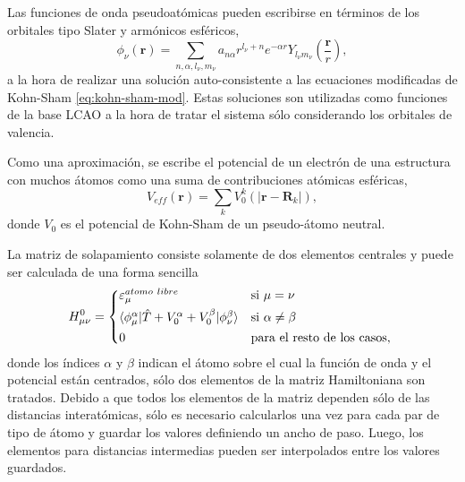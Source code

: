 \begin{enumerate}
        Las funciones de onda pseudoatómicas pueden escribirse en términos de los
        orbitales tipo Slater y armónicos esféricos,
        \begin{equation*}
        \phi_{\nu}(\mathbf{r}) = \sum_{n,\alpha,l_{\nu},m_{\nu}} a_{n\alpha} r^{l_{\nu}+n} e^{-\alpha r} Y_{l_{\nu}m_{\nu}}\left(\frac{\mathbf{r}}{r}\right),
        \end{equation*}
        a la hora de realizar una solución auto-consistente a las ecuaciones
        modificadas de Kohn-Sham \ref{eq:kohn-sham-mod}. Estas soluciones son
        utilizadas como funciones de la base LCAO a la hora de tratar el sistema
        sólo considerando los orbitales de valencia.
        
        Como una aproximación, se escribe el potencial de un electrón de una 
        estructura con muchos átomos como una suma de contribuciones atómicas
        esféricas,
        \begin{equation*}
        V_{eff}(\mathbf{r}) = \sum_k V_0^k(|\mathbf{r} - \mathbf{R}_k|),
        \end{equation*}
        donde $V_0$ es el potencial de Kohn-Sham de un pseudo-átomo neutral.

        La matriz de solapamiento consiste solamente de dos elementos centrales
        y puede ser calculada de una forma sencilla
        \begin{equation*}
            H_{\mu\nu}^0 = 
            \begin{cases*}
                \varepsilon_{\mu}^{atomo\ libre} & si $\mu = \nu$ \\
                \langle \phi_{\mu}^{\alpha} | \hat{T} + V_0^{\alpha} + V_0^{\beta} | \phi_{\nu}^{\beta} \rangle & si $\alpha \neq \beta$ \\
                0 & para el resto de los casos,
            \end{cases*}
        \end{equation*}
        donde los índices $\alpha$ y $\beta$ indican el átomo sobre el cual la
        función de onda y el potencial están centrados, sólo dos elementos de la 
        matriz Hamiltoniana son tratados. Debido a que todos los elementos de la 
        matriz dependen sólo de las distancias interatómicas, sólo es necesario
        calcularlos una vez para cada par de tipo de átomo y guardar los valores
        definiendo un ancho de paso. Luego, los elementos para distancias 
        intermedias pueden ser interpolados entre los valores guardados.


\end{enumerate}

